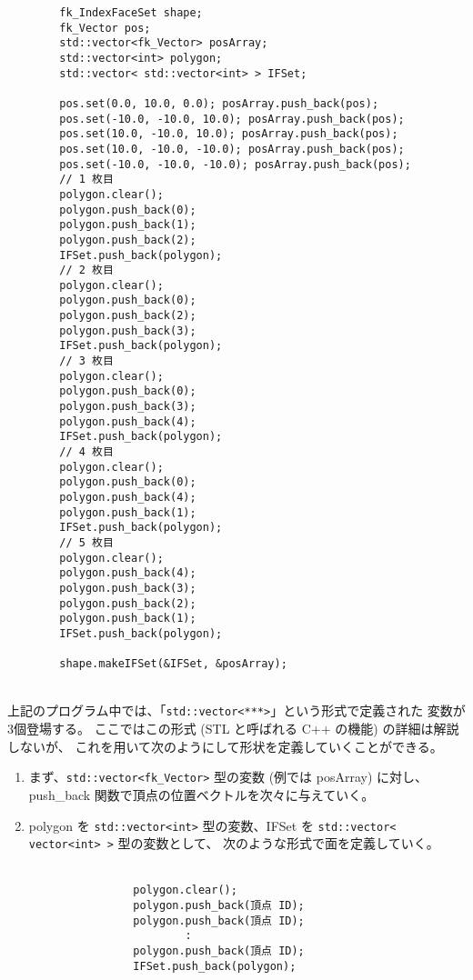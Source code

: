 \begin{breakbox}
\begin{verbatim}
        fk_IndexFaceSet shape;
        fk_Vector pos;
        std::vector<fk_Vector> posArray;
        std::vector<int> polygon;
        std::vector< std::vector<int> > IFSet;
    
        pos.set(0.0, 10.0, 0.0); posArray.push_back(pos);
        pos.set(-10.0, -10.0, 10.0); posArray.push_back(pos);
        pos.set(10.0, -10.0, 10.0); posArray.push_back(pos);
        pos.set(10.0, -10.0, -10.0); posArray.push_back(pos);
        pos.set(-10.0, -10.0, -10.0); posArray.push_back(pos);
        // 1 枚目
        polygon.clear();
        polygon.push_back(0);
        polygon.push_back(1);
        polygon.push_back(2);
        IFSet.push_back(polygon);
        // 2 枚目
        polygon.clear();
        polygon.push_back(0);
        polygon.push_back(2);
        polygon.push_back(3);
        IFSet.push_back(polygon);
        // 3 枚目
        polygon.clear();
        polygon.push_back(0);
        polygon.push_back(3);
        polygon.push_back(4);
        IFSet.push_back(polygon);
        // 4 枚目
        polygon.clear();
        polygon.push_back(0);
        polygon.push_back(4);
        polygon.push_back(1);
        IFSet.push_back(polygon);
        // 5 枚目
        polygon.clear();
        polygon.push_back(4);
        polygon.push_back(3);
        polygon.push_back(2);
        polygon.push_back(1);
        IFSet.push_back(polygon);

        shape.makeIFSet(&IFSet, &posArray);
\end{verbatim}
\end{breakbox}
~ \\
上記のプログラム中では、「\verb+std::vector<***>+」という形式で定義された
変数が3個登場する。
ここではこの形式 (STL と呼ばれる C++ の機能) の詳細は解説しないが、
これを用いて次のようにして形状を定義していくことができる。
\begin{enumerate}
 \item まず、\verb+std::vector<fk_Vector>+ 型の変数 (例では posArray) に対し、
	push\_back 関数で頂点の位置ベクトルを次々に与えていく。

 \item polygon を \verb+std::vector<int>+ 型の変数、IFSet を
	\verb+std::vector< vector<int> >+ 型の変数として、
	次のような形式で面を定義していく。\\ ~ \\
	\begin{screen}
	\begin{verbatim}
                polygon.clear();
                polygon.push_back(頂点 ID);
                polygon.push_back(頂点 ID);
                        :
                polygon.push_back(頂点 ID);
                IFSet.push_back(polygon);
	\end{verbatim}
	\end{screen}
\end{enumerate}

